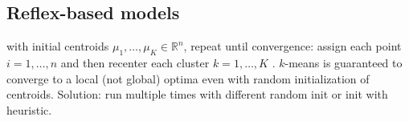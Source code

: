 \subsection{Reflex-based models}
 with initial centroids $\mu_1,\dots,\mu_K \in \mathbb{R}^n$,
repeat until convergence:
assign each point $i=1,\dots,n$ 
and then recenter each cluster $k=1,\dots,K$
.
$k$-means is guaranteed to converge to a local (not global) optima even with
random initialization of centroids. Solution: run multiple times with different
random init or init with heuristic.

